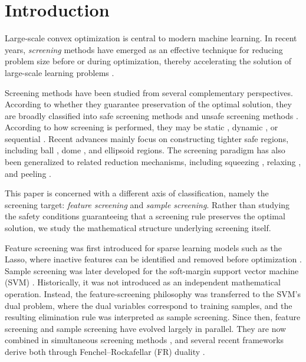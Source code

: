 \section{Introduction}
\label{sec:intro}

Large-scale convex optimization is central to modern machine learning. In recent years, \emph{screening} methods have emerged as an effective technique for reducing problem size before or during optimization, thereby accelerating the solution of large-scale learning problems \citep{elghaoui2010}.

Screening methods have been studied from several complementary perspectives. According to whether they guarantee preservation of the optimal solution, they are broadly classified into safe screening methods \citep{elghaoui2010} and unsafe screening methods \citep{tibshirani2012strong,fan2018sure}. According to how screening is
performed, they may be static
\citep{elghaoui2010}, dynamic
\citep{bonnefoy2014dynamic}, or sequential
\citep{wang2013lasso}. Recent advances mainly focus on constructing
tighter safe regions, including ball
\citep{ndiaye2017gap,tran2025one}, dome
\citep{tran2022beyond}, and ellipsoid
\citep{dai2012ellipsoid} regions. The screening paradigm has also been generalized to related reduction mechanisms, including squeezing \citep{elvira2020safe}, relaxing \citep{guyard2022screen}, and peeling \citep{guyard2023safe}.

This paper is concerned with a different axis of classification,
namely the screening target: \emph{feature screening} and \emph{sample screening}.
Rather than studying the safety conditions guaranteeing that a
screening rule preserves the optimal solution, we study the
mathematical structure underlying screening itself.

Feature screening was first introduced for sparse learning models such
as the Lasso, where inactive features can be identified and removed
before optimization \citep{elghaoui2010}. Sample screening was
later developed for the soft-margin support vector machine (SVM)
\citep{ogawa2013}. Historically, it was not introduced as an
independent mathematical operation. Instead, the feature-screening
philosophy was transferred to the SVM's dual problem, where the
dual variables correspond to training samples, and the resulting
elimination rule was interpreted as sample screening. Since then,
feature screening and sample screening have evolved largely in
parallel. They are now combined in simultaneous screening methods
\citep{shibagaki2016simultaneous}, and several recent frameworks derive
both through Fenchel--Rockafellar (FR) duality
\citep{ndiaye2017gap,yamada2021dynamic,tran2025one}.

